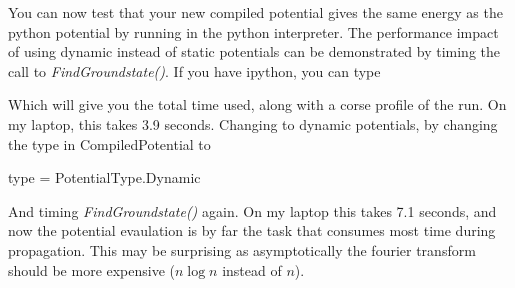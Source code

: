 You can now test that your new compiled potential gives the same energy as the python potential by running
 in the python interpreter. The performance impact of using dynamic instead of static potentials
can be demonstrated by timing the call to \textit{FindGroundstate()}. If you have ipython, you can type
\begin{python}
\end{python}
Which will give you the total time used, along with a corse profile of the run. On my laptop, this takes 3.9 seconds. 
Changing to dynamic potentials, by changing the type in CompiledPotential to
\begin{python}
	type = PotentialType.Dynamic
\end{python}
And timing \textit{FindGroundstate()} again. On my laptop this takes 7.1 seconds, and now the potential evaulation is 
by far the 
task that consumes most time during propagation. This may be surprising as asymptotically the fourier transform should be more
expensive ($n \log n$ instead of $n$).
